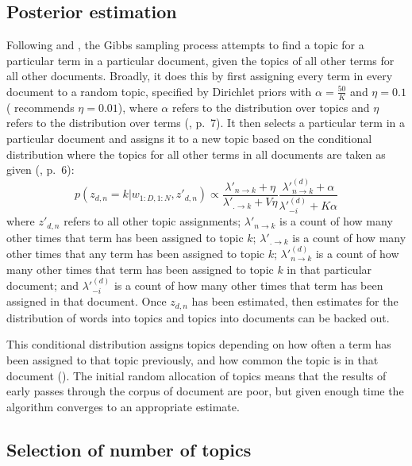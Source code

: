 \documentclass[12pt,]{article}
\theoremstyle{definition}
\theoremstyle{definition}
\theoremstyle{definition}
\theoremstyle{remark}
\begin{document}
\subsection{Posterior estimation}\label{LDAposteriorestimation}

Following \citet{SteyversGriffiths2006} and \citet{Darling2011}, the
Gibbs sampling process attempts to find a topic for a particular term in
a particular document, given the topics of all other terms for all other
documents. Broadly, it does this by first assigning every term in every
document to a random topic, specified by Dirichlet priors with
\(\alpha = \frac{50}{K}\) and \(\eta = 0.1\)
(\citet{SteyversGriffiths2006} recommends \(\eta = 0.01\)), where
\(\alpha\) refers to the distribution over topics and \(\eta\) refers to
the distribution over terms (\citet{Grun2011}, p.~7). It then selects a
particular term in a particular document and assigns it to a new topic
based on the conditional distribution where the topics for all other
terms in all documents are taken as given (\citet{Grun2011}, p.~6):
\[p(z_{d, n}=k | w_{1:D, 1:N}, z'_{d, n}) \propto \frac{\lambda'_{n\rightarrow k}+\eta}{\lambda'_{.\rightarrow k}+V\eta} \frac{\lambda'^{(d)}_{n\rightarrow k}+\alpha}{\lambda'^{(d)}_{-i}+K\alpha} \]
where \(z'_{d, n}\) refers to all other topic assignments;
\(\lambda'_{n\rightarrow k}\) is a count of how many other times that
term has been assigned to topic \(k\); \(\lambda'_{.\rightarrow k}\) is
a count of how many other times that any term has been assigned to topic
\(k\); \(\lambda'^{(d)}_{n\rightarrow k}\) is a count of how many other
times that term has been assigned to topic \(k\) in that particular
document; and \(\lambda'^{(d)}_{-i}\) is a count of how many other times
that term has been assigned in that document. Once \(z_{d,n}\) has been
estimated, then estimates for the distribution of words into topics and
topics into documents can be backed out.

This conditional distribution assigns topics depending on how often a
term has been assigned to that topic previously, and how common the
topic is in that document (\citet{SteyversGriffiths2006}). The initial
random allocation of topics means that the results of early passes
through the corpus of document are poor, but given enough time the
algorithm converges to an appropriate estimate.

\subsection{Selection of number of topics}\label{selecttopicnumber}
\end{document}
